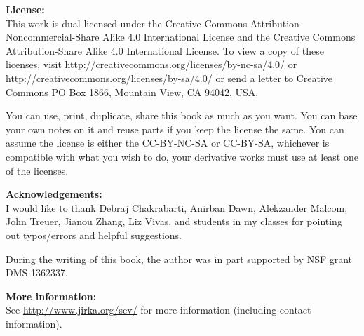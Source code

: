 \documentclass[12pt,openany]{book}
\theoremstyle{plain}
\theoremstyle{remark}
\theoremstyle{definition}
\theoremstyle{exercise}
\theoremstyle{example}
\begin{document}
\bigskip

\noindent
\textbf{License:}
\\
This work is dual licensed under
the Creative Commons
Attribution-Non\-commercial-Share Alike 4.0 International License and
the Creative Commons
Attribution-Share Alike 4.0 International License.
To view a
copy of these licenses, visit
\url{http://creativecommons.org/licenses/by-nc-sa/4.0/}
or
\url{http://creativecommons.org/licenses/by-sa/4.0/}
or send a letter to
Creative Commons
PO Box 1866, Mountain View, CA 94042, USA.

\bigskip

\noindent
You can use, print, duplicate, share this book as much as you want.  You can
base your own notes on it and reuse parts if you keep the license the
same.  You can assume the license is either the CC-BY-NC-SA or CC-BY-SA,
whichever is compatible with what you wish to do, your derivative works must
use at least one of the licenses.

\bigskip

\noindent
\textbf{Acknowledgements:}
\\
I would like to thank Debraj Chakrabarti, Anirban Dawn, Alekzander Malcom,
John Treuer, Jianou Zhang, Liz Vivas,
and students in my classes for pointing out typos/errors
and helpful suggestions. 

\bigskip

\noindent
During the writing of this book, 
the author was in part supported by NSF grant DMS-1362337.

\bigskip

\noindent
\textbf{More information:}
\\
See \url{http://www.jirka.org/scv/} for more information
(including contact information).



\tableofcontents
{}


\end{document}
